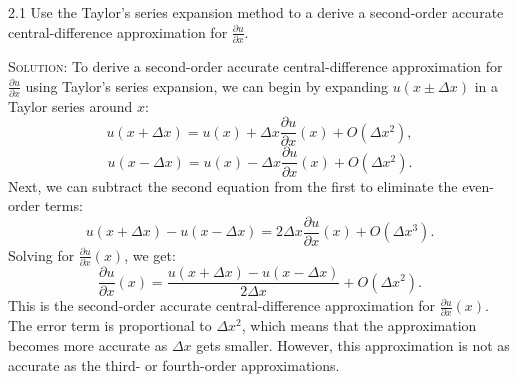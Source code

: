\documentclass{article}
\begin{document}
2.1 Use the Taylor's series expansion method to a derive a second-order accurate 
central-difference approximation for $\frac{\partial u}{\partial x}$.

\textsc{Solution:} To derive a second-order accurate central-difference approximation for $\frac{\partial u}{\partial x}$ using Taylor's series expansion, we can begin by expanding $u(x \pm \Delta x)$ in a Taylor series around $x$:
\[
u(x + \Delta x) = u(x) + \Delta x \frac{\partial u}{\partial x}(x) + O(\Delta x^2),
\]
\[
u(x - \Delta x) = u(x) - \Delta x \frac{\partial u}{\partial x}(x) + O(\Delta x^2).
\]
Next, we can subtract the second equation from the first to eliminate the even-order terms:
\[
u(x + \Delta x) - u(x - \Delta x) = 2 \Delta x \frac{\partial u}{\partial x}(x) + O(\Delta x^3).
\]
Solving for $\frac{\partial u}{\partial x}(x)$, we get:
\[
\frac{\partial u}{\partial x}(x) = \frac{u(x + \Delta x) - u(x - \Delta x)}{2 \Delta x} + O(\Delta x^2).
\]
This is the second-order accurate central-difference approximation for $\frac{\partial u}{\partial x}(x)$. The error term is proportional to $\Delta x^2$, which means that the approximation becomes more accurate as $\Delta x$ gets smaller. However, this approximation is not as accurate as the third- or fourth-order approximations.
\end{document}
